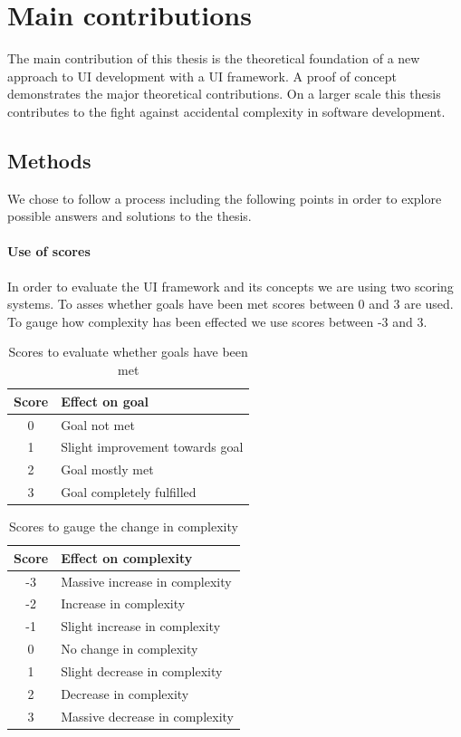 \section{Main contributions}\label{contributions}
The main contribution of this thesis is the theoretical foundation of a new approach to UI development with a UI framework. A proof of concept demonstrates the major theoretical contributions. On a larger scale this thesis contributes to the fight against accidental complexity in software development.

\subsection{Methods}\label{usecases}
We chose to follow a process including the following points in order to explore possible answers and solutions to the thesis.

\paragraph{Use of scores}
In order to evaluate the UI framework and its concepts we are using two scoring systems. To asses whether goals have been met scores between 0 and 3 are used. To gauge how complexity has been effected we use scores between -3 and 3.

\begin{table}[]
  \begin{center}
    \begin{tabular}{|c|l|}
      \hline
      Score & Effect on goal \\
      \hline
      0 & Goal not met \\
      1 & Slight improvement towards goal \\
      2 & Goal mostly met \\
      3 & Goal completely fulfilled \\
      \hline
    \end{tabular}
    \caption{Scores to evaluate whether goals have been met}
  \end{center}
\end{table}

\begin{table}[]
  \begin{center}
    \begin{tabular}{|c|l|}
      \hline
      Score & Effect on complexity \\
      \hline
      -3 & Massive increase in complexity \\
      -2 & Increase in complexity \\
      -1 & Slight increase in complexity \\
      0 & No change in complexity \\
      1 & Slight decrease in complexity \\
      2 & Decrease in complexity \\
      3 & Massive decrease in complexity \\
      \hline
    \end{tabular}
    \caption{Scores to gauge the change in complexity}
  \end{center}
\end{table}

